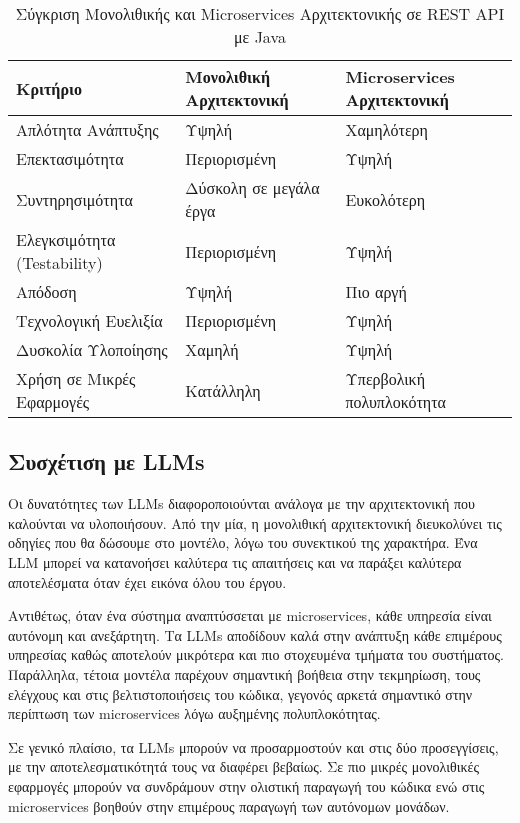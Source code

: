 \begin{table}[H]
\centering
\caption{Σύγκριση Μονολιθικής και Microservices Αρχιτεκτονικής σε REST API με Java}
\begin{tabularx}{\textwidth}{|X|X|X|}
\hline
\textbf{Κριτήριο} & \textbf{Μονολιθική Αρχιτεκτονική} & \textbf{Microservices Αρχιτεκτονική} \\
\hline
Απλότητα Ανάπτυξης & Υψηλή & Χαμηλότερη  \\
\hline
Επεκτασιμότητα & Περιορισμένη & Υψηλή \\
\hline
Συντηρησιμότητα & Δύσκολη σε μεγάλα έργα & Ευκολότερη  \\
\hline
Ελεγκσιμότητα (Testability) & Περιορισμένη & Υψηλή  \\
\hline
Απόδοση & Υψηλή & Πιο αργή \\
\hline
Τεχνολογική Ευελιξία & Περιορισμένη & Υψηλή  \\
\hline
Δυσκολία Υλοποίησης & Χαμηλή & Υψηλή \\
\hline
Χρήση σε Μικρές Εφαρμογές & Κατάλληλη & Υπερβολική πολυπλοκότητα \\
\hline
\end{tabularx}
\end{table}


\subsection{Συσχέτιση με LLMs}
Οι δυνατότητες των LLMs διαφοροποιούνται ανάλογα με την αρχιτεκτονική που καλούνται να υλοποιήσουν. Από την μία, η μονολιθική αρχιτεκτονική διευκολύνει τις οδηγίες που θα δώσουμε στο μοντέλο, λόγω του συνεκτικού της χαρακτήρα. Ένα LLM μπορεί να κατανοήσει καλύτερα τις απαιτήσεις και να παράξει καλύτερα αποτελέσματα όταν έχει εικόνα όλου του έργου.

Αντιθέτως, όταν ένα σύστημα αναπτύσσεται με microservices, κάθε υπηρεσία είναι αυτόνομη και ανεξάρτητη. Τα LLMs αποδίδουν καλά στην ανάπτυξη κάθε επιμέρους υπηρεσίας καθώς αποτελούν μικρότερα και πιο στοχευμένα τμήματα του συστήματος. Παράλληλα, τέτοια μοντέλα παρέχουν σημαντική βοήθεια στην τεκμηρίωση, τους ελέγχους και στις βελτιστοποιήσεις του κώδικα, γεγονός αρκετά σημαντικό στην περίπτωση των microservices λόγω αυξημένης πολυπλοκότητας.

Σε γενικό πλαίσιο, τα LLMs μπορούν να προσαρμοστούν και στις δύο προσεγγίσεις, με την αποτελεσματικότητά τους να διαφέρει βεβαίως. Σε πιο μικρές μονολιθικές εφαρμογές μπορούν να συνδράμουν στην ολιστική παραγωγή του κώδικα ενώ στις microservices βοηθούν στην επιμέρους παραγωγή των αυτόνομων μονάδων.